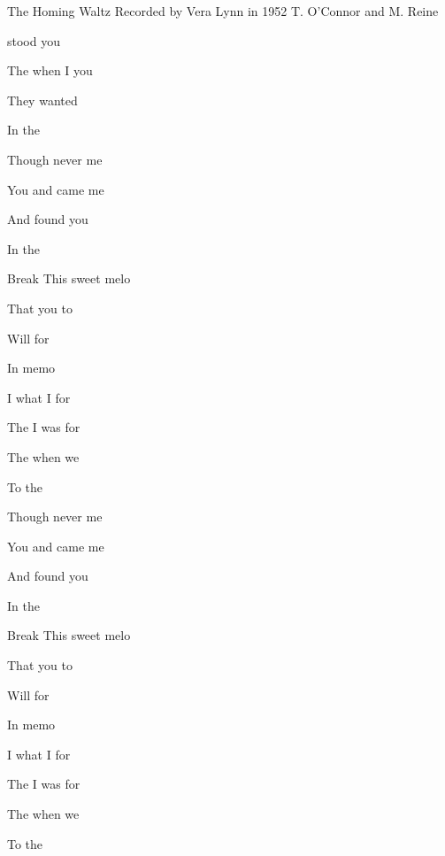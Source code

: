 \begin{SBSong}{The Homing Waltz}
  {Recorded by Vera Lynn in 1952}
  {T. O'Connor and M. Reine}
  \begin{SBVerse}
	  stood  you
	
	The  when I  you
	
	They  wanted 
	
	In the   
  \end{SBVerse}
  \begin{SBVerse}
	Though  never  me
	
	You  and came  me
	
	And  found you 
	
	In the  
  \end{SBVerse}
  \begin{SBBracket}{Break}
	This sweet melo

	That  you to 

	Will  for 

	In  memo
  \end{SBBracket}
  \begin{SBVerse}
	I  what I  for
	
	The  I was  for
	
	The  when we 
	
	To the   
  \end{SBVerse}
  \begin{SBVerse}
	Though  never  me
	
	You  and came  me
	
	And  found you 
	
	In the  
  \end{SBVerse}
  \CBPageBrk
  \begin{SBBracket}{Break}
	This sweet melo

	That  you to 

	Will  for 

	In  memo
  \end{SBBracket}
  \begin{SBVerse}
	I  what I  for
	
	The  I was  for
	
	The  when we 
	
	To the   
  \end{SBVerse}
\end{SBSong}